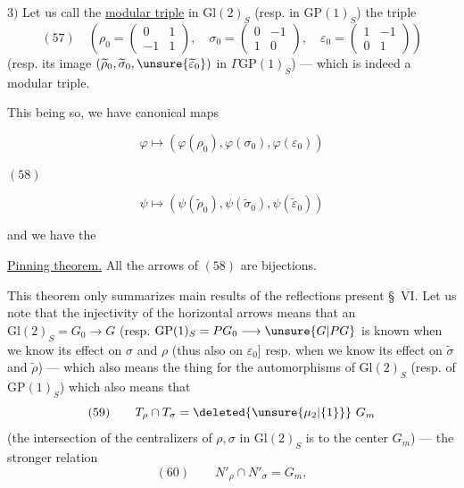  $3)$ Let us call the \uline{}
\uline{modular triple} in $\mathrm{Gl}(2)_S$
(resp. in $\mathrm{GP}(1)_S$) the triple
\[
(57)\quad\left(\rho_0=\begin{pmatrix}0&1\\-1&1\end{pmatrix},\quad
\sigma_0=\begin{pmatrix}0&-1\\1&0\end{pmatrix},\quad
\varepsilon_0=\begin{pmatrix}1&-1\\0&1\end{pmatrix}\right)
\]
(resp. its image $(\widetilde\rho_0,\widetilde\sigma_0,
\unsure{\widetilde\varepsilon_0})$ in $\Gamma\mathrm{GP}(1)_S$) ---
which is indeed a modular triple.

This being so, we have  canonical
maps


\[
\varphi\longmapsto(\varphi(\rho_0),\varphi(\sigma_0),\varphi(\varepsilon_0))
\]

\begin{samepage}
$(58)$
\end{samepage}
\[
\psi\longmapsto(\psi(\widetilde\rho_0),\psi(\widetilde\sigma_0),
\psi(\widetilde\varepsilon_0))
\]

and we have the

\uline{Pinning theorem.} All the arrows of $(58)$ are bijections.

This theorem only summarizes 
 main results of the reflections
 present \S\ \uline{$\overline{\mathrm{VI}}$}.
Let us note that the injectivity of the horizontal arrows means 
that an 
$\mathrm{Gl}(2)_S=G_0\longrightarrow G$
(resp. $\mathrm{GP}(1)_S=PG_0\longrightarrow\unsure{G|PG}$
is known when we know its effect on $\sigma$ and $\rho$
(thus also on $\varepsilon_0$]
\unsure{$\leftarrow$} resp. when we know its effect on
$\widetilde\sigma$ and $\widetilde\rho$) --- which also means
the  thing for the automorphisms of
$\mathrm{Gl}(2)_S$ (resp. of $\mathrm{GP}(1)_S$)
which also means that
\[
(59)\qquad T_\rho\cap T_\sigma=\deleted{\unsure{\mu_2|\{1\}}}\ G_m
\]
(the intersection of the centralizers of $\rho,\sigma$ in
$\mathrm{Gl}(2)_S$ is  to the center $G_m$) ---
 the stronger relation
\[
(60)\qquad N'_\rho\cap N'_\sigma=G_m,
\]

